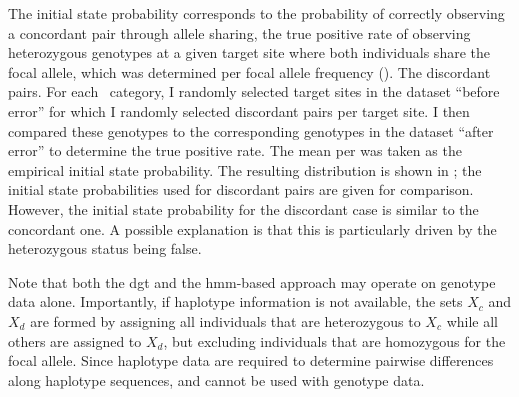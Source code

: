 The initial state probability corresponds to the probability of correctly observing a concordant pair through allele sharing, \ie the true positive rate of observing heterozygous genotypes at a given target site where both individuals share the focal allele, which was determined per focal allele frequency (\fk{}).
The  discordant pairs.
For each \fk{}~category, I randomly selected  target sites in the dataset ``before error'' for which I randomly selected  discordant pairs per target site.
I then compared these genotypes to the corresponding genotypes in the dataset ``after error'' to determine the true positive rate.
The mean per \fk{} was taken as the empirical initial state probability.
The resulting distribution is shown in ; the initial state probabilities used for discordant pairs are given for comparison.
However, the initial state probability for the discordant case is similar to the concordant one.
A possible explanation is that this is particularly driven by the heterozygous status being false.



Note that both the \gls{dgt} and the \gls{hmm}-based approach may operate on genotype data alone.
Importantly, if haplotype information is not available, the sets $X_c$ and $X_d$ are formed by assigning all individuals that are heterozygous to $X_c$ while all others are assigned to $X_d$, but excluding individuals that are homozygous for the focal allele.
Since haplotype data are required to determine pairwise differences along haplotype sequences, \ClockM and \ClockC cannot be used with genotype data.





